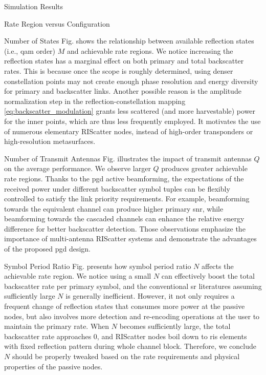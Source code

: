 \documentclass[journal]{IEEEtran}
\begin{document}
\begin{section}{Simulation Results}
\begin{subsection}{Rate Region versus Configuration}
		\begin{subsubsection}{Number of States}
			Fig.  shows the relationship between available reflection states (i.e., \gls{qam} order) $M$ and achievable rate regions.
			We notice increasing the reflection states has a marginal effect on both primary and total backscatter rates.
			This is because once the scope is roughly determined, using denser constellation points may not create enough phase resolution and energy diversity for primary and backscatter links.
			Another possible reason is the amplitude normalization step in the reflection-constellation mapping \eqref{eq:backscatter_modulation} grants less scattered (and more harvestable) power for the inner points, which are thus less frequently employed.
			It motivates the use of numerous elementary RIScatter nodes, instead of high-order transponders or high-resolution metasurfaces.
		\end{subsubsection}

		\begin{subsubsection}{Number of Transmit Antennas}
			Fig.  illustrates the impact of transmit antennas $Q$ on the average performance.
			We observe larger $Q$ produces greater achievable rate regions.
			Thanks to the \gls{pgd} active beamforming, the expectations of the received power under different backscatter symbol tuples can be flexibly controlled to satisfy the link priority requirements.
			For example, beamforming towards the equivalent channel can produce higher primary \gls{snr}, while beamforming towards the cascaded channels can enhance the relative energy difference for better backscatter detection.
			Those observations emphasize the importance of multi-antenna RIScatter systems and demonstrate the advantages of the proposed \gls{pgd} design.
		\end{subsubsection}

		\begin{subsubsection}{Symbol Period Ratio}
			Fig.  presents how symbol period ratio $N$ affects the achievable rate region.
			We notice using a small $N$ can effectively boost the total backscatter rate per primary symbol, and the conventional \gls{sr} literatures assuming sufficiently large $N$ is generally inefficient.
			However, it not only requires a frequent change of reflection states that consumes more power at the passive nodes, but also involves more detection and re-encoding operations at the user to maintain the primary rate.
			When $N$ becomes sufficiently large, the total backscatter rate approaches \num{0}, and RIScatter nodes boil down to \gls{ris} elements with fixed reflection pattern during whole channel block.
			Therefore, we conclude $N$ should be properly tweaked based on the rate requirements and physical properties of the passive nodes.
		\end{subsubsection}


\end{subsection}
\end{section}
\end{document}
